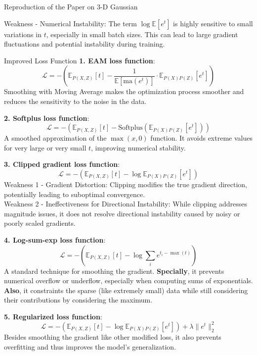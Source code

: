\documentclass[final]{beamer}
\newlength{\colwidth}
\begin{document}
\begin{frame}[t]
\begin{columns}[t]
\begin{column}{\colwidth}
\begin{block}{Reproduction of the Paper on 3-D Gaussian}
\begin{figure}
\begin{minipage}{0.5\textwidth}
    \end{minipage}
    \end{figure}
    Weakness - Numerical Instability: The term $\log \mathbb{E}[e^t]$ is highly sensitive to small variations in $t$, especially in small batch sizes. This can lead to large gradient fluctuations and potential instability during training.\\
  \end{block}

  \begin{block}{Improved Loss Function}
  \textbf{1. EAM loss function}:
  $$\mathcal L = - \left( \mathbb{E}_{P(X, Z)}[t] - \frac{1}{\mathbb{E}[\text{ma}(e^{t})]}\cdot \mathbb{E}_{P(X)P(Z)}\left[e^{t}\right] \right)$$
  Smoothing with Moving Average makes the optimization process smoother and reduces the sensitivity to the noise in the data.
  
  \textbf{2. Softplus loss function}:
  $$\mathcal{L} = - \left( \mathbb{E}_{P(X, Z)}[t] - \text{Softplus}\left(\mathbb{E}_{P(X)P(Z)}[e^t]\right) \right)$$
  A smoothed approximation of the $\max(x, 0)$ function. It avoids extreme values for very large or very small $t$, improving numerical stability.

  \textbf{3. Clipped gradient loss function}:
  $$\mathcal{L} = - \left( \mathbb{E}_{P(X, Z)}[t] - \log \mathbb{E}_{P(X)P(Z)}[e^t] \right)$$
  Weakness 1 - Gradient Distortion: Clipping modifies the true gradient direction, potentially leading to suboptimal convergence.\\
  Weakness 2 - Ineffectiveness for Directional Instability: While clipping addresses magnitude issues, it does not resolve directional instability caused by noisy or poorly scaled gradients.

  \textbf{4. Log-sum-exp loss function}:
  $$\mathcal{L} = - \left( \mathbb{E}_{P(X, Z)}[t] - \log \sum_{i} e^{t_i - \max(t)} \right)$$
  A standard technique for smoothing the gradient. \textbf{Specially}, it prevents numerical overflow or underflow, especially when computing sums of exponentials. \textbf{Also}, it constraints the sparse (like extremely small) data while still considering their contributions by considering the maximum.

  \textbf{5. Regularized loss function}:
  $$\mathcal{L} = - \left( \mathbb{E}_{P(X, Z)}[t] - \log \mathbb{E}_{P(X)P(Z)}[e^t] \right) + \lambda \|e^t\|_2^2$$
  Besides smoothing the gradient like other modified loss, it also prevents overfitting and thus improves the model's generalization.


\end{block}
\end{column}
\end{columns}
\end{frame}
\end{document}
